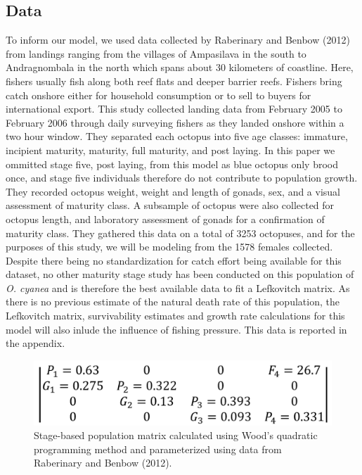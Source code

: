 \documentclass[
]{article}
\begin{document}
\hypertarget{data}{%
\subsection{Data}\label{data}}

To inform our model, we used data collected by Raberinary and Benbow (2012) from landings ranging from the villages of Ampasilava in the south to Andragnombala in the north which spans about 30 kilometers of coastline. Here, fishers usually fish along both reef flats and deeper barrier reefs. Fishers bring catch onshore either for household consumption or to sell to buyers for international export. This study collected landing data from February 2005 to February 2006 through daily surveying fishers as they landed onshore within a two hour window. They separated each octopus into five age classes: immature, incipient maturity, maturity, full maturity, and post laying. In this paper we ommitted stage five, post laying, from this model as blue octopus only brood once, and stage five individuals therefore do not contribute to population growth. They recorded octopus weight, weight and length of gonads, sex, and a visual assessment of maturity class. A subsample of octopus were also collected for octopus length, and laboratory assessment of gonads for a confirmation of maturity class. They gathered this data on a total of 3253 octopuses, and for the purposes of this study, we will be modeling from the 1578 females collected. Despite there being no standardization for catch effort being available for this dataset, no other maturity stage study has been conducted on this population of \emph{O. cyanea} and is therefore the best available data to fit a Lefkovitch matrix. As there is no previous estimate of the natural death rate of this population, the Lefkovitch matrix, survivability estimates and growth rate calculations for this model will also inlude the influence of fishing pressure. This data is reported in the appendix.

\begin{figure}
\includegraphics[width=1\linewidth]{MtxFilled} \caption{Stage-based population matrix calculated using Wood's quadratic programming method and parameterized using data from Raberinary and Benbow (2012). \label{WriteMtxRounded}}\label{fig:WriteMtxRounded}
\end{figure}
\end{document}
